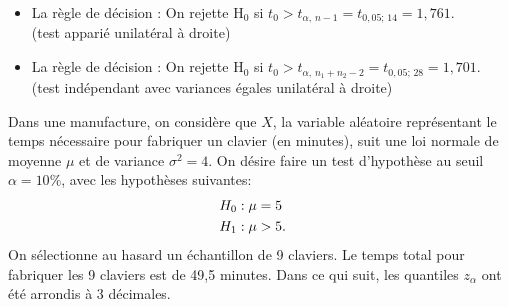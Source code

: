 \begin{questions}
\begin{parts}
\end{parts}

 
\begin{solution}
	\begin{itemize}
		\item La règle de décision : On rejette $\mathrm{H}_0$ si $t_0 > t_{\alpha, \, n-1} = t_{0,05; \, 14} = 1,761$.\\
		(test apparié unilatéral à droite)
		\item La règle de décision : On rejette $\mathrm{H}_0$ si $t_0 > t_{\alpha, \, n_1+n_2-2} = t_{0,05; \, 28} = 1,701$.\\
		(test indépendant avec variances égales unilatéral à droite)
	\end{itemize}
\end{solution}

\newpage
\question\label{puissance}

Dans une manufacture, on considère que $X$, la variable aléatoire représentant le temps nécessaire pour fabriquer un clavier (en minutes), suit une loi normale de moyenne $\mu$ et de variance $\sigma^2=4$. On désire faire un test d'hypothèse au seuil $\alpha=10\%$, avec les hypothèses suivantes:
\begin{align*}
	H_0&: \mu=5\cr
	H_1&: \mu > 5.
\end{align*}
On sélectionne au hasard un échantillon de 9 claviers. Le temps total pour fabriquer les 9 claviers est de 49,5 minutes. Dans ce qui suit, les quantiles $z_\alpha$ ont été arrondis à 3 décimales.

\medskip\medskip


\end{questions}
